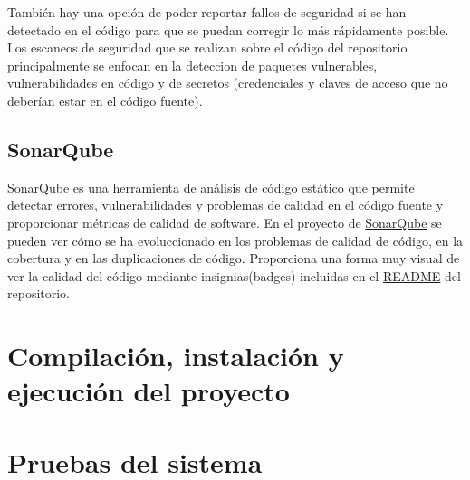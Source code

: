 También hay una opción de poder reportar fallos de seguridad si se han detectado en el código para que se puedan corregir lo más rápidamente posible.
Los escaneos de seguridad que se realizan sobre el código del repositorio principalmente se enfocan en la deteccion de paquetes vulnerables, vulnerabilidades en código y de secretos (credenciales y claves de acceso que no deberían estar en el código fuente).

\subsection{SonarQube}
SonarQube es una herramienta de análisis de código estático que permite detectar errores, vulnerabilidades y problemas de calidad en el código fuente y proporcionar métricas de calidad de software. En el proyecto de \href{https://sonarcloud.io/project/overview?id=CesarRodrigu_GII-24.19-contramedidas-IoT-mediante-reinforcement-learning}{SonarQube} se pueden ver cómo se ha evoluccionado en los problemas de calidad de código, en la cobertura y en las duplicaciones de código. Proporciona una forma muy visual de ver la calidad del código mediante insignias(badges) incluidas en el \href{https://github.com/CesarRodrigu/GII-24.19-contramedidas-IoT-mediante-reinforcement-learning/blob/57-inicio-del-proceso-de-documentaci%C3%B3n-de-la-memoria/README.md}{README} del repositorio.


\section{Compilación, instalación y ejecución del proyecto}

\section{Pruebas del sistema}
